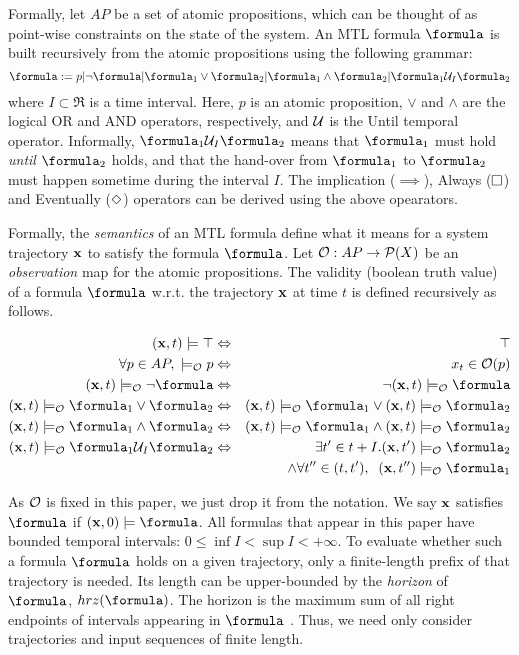 Formally, let $AP$ be a set of atomic propositions, which can be thought of as point-wise constraints on the state of the system.
An MTL formula $\formula$ is built recursively from the atomic propositions using the following grammar:
\[\formula \defeq p|\neg \formula | \formula_1 \lor \formula_2 | \formula_1 \land \formula_2 | \formula_1 \until_I \formula_2\]
where $I \subset \Re$ is a time interval.
Here, $p$ is an atomic proposition, $\lor$ and $\land$ are the logical OR and AND operators, respectively, and $\mathcal{U}$ is the Until temporal operator.
Informally, $\formula_1 \until_I \formula_2$ means that $\formula_1$ must hold \textit{until} $\formula_2$ holds, and that the hand-over from $\formula_1$  to $\formula_2$ must happen sometime during the interval $I$.
The implication ($\implies$), Always ($\square$) and Eventually ($\Diamond$) operators can be derived using the above opearators.

Formally, the \textit{semantics} of an MTL formula define what it means for a system trajectory $\mathbf{x}$ to satisfy the formula $\formula$.
Let $\mathcal{O}: AP \rightarrow \mathcal{P}(X)$ be an \textit{observation} map for the atomic propositions.
The validity (boolean truth value) of a formula $\formula$ w.r.t. the trajectory $\mathbf{x}$ at time $t$ is defined recursively as follows.
\begin{definition}
	\label{def:boolean sat}
	\begin{eqnarray*}
		\label{eq:boolean sat}
		(\sstraj,t) \models \top &\Leftrightarrow& \top
		\\
		\forall p \in AP, \; \models_\Oc p &\Leftrightarrow& x_t \in \Oc(p)
		\\
		(\sstraj,t) \models_\Oc \neg \formula&\Leftrightarrow& \neg (\sstraj,t) \models_\Oc \formula
		\\
		(\sstraj,t) \models_\Oc \formula_1 \lor \formula_2 &\Leftrightarrow& (\sstraj,t) \models_\Oc \formula_1 \lor (\sstraj,t) \models_\Oc \formula_2
		\\
		(\sstraj,t) \models_\Oc  \formula_1 \land \formula_2&\Leftrightarrow& (\sstraj,t) \models_\Oc \formula_1 \land (\sstraj,t) \models_\Oc \formula_2
		\\
		(\sstraj,t) \models_\Oc \formula_1 \until_I \formula_2 &\Leftrightarrow& \exists t' \in t+I .  (\sstraj,t') \models_\Oc \formula_2  
		\\
		&& \, \land \forall t'' \in (t,t'), \;\; (\sstraj,t'') \models_\Oc \formula_1 
	\end{eqnarray*}
\end{definition}
As $\mathcal{O}$ is fixed in this paper, we just drop it from the notation.
We say $\mathbf{x}$ satisfies $\formula$ if $(\sstraj,0) \models \formula$.
All formulas that appear in this paper have bounded temporal intervals: $ 0\leq \inf I < \sup I < +\infty$.
To evaluate whether such a formula $\formula$ holds on a given trajectory, only a finite-length prefix of that trajectory is needed.
Its length can be upper-bounded by the \textit{horizon} of $\formula$, $hrz(\formula)$.
The horizon is the maximum sum of all right endpoints of intervals appearing in $\formula$ \cite{Dokhanchi14_OnlineMonitoring}.
Thus, we need only consider trajectories and input sequences of finite length.


